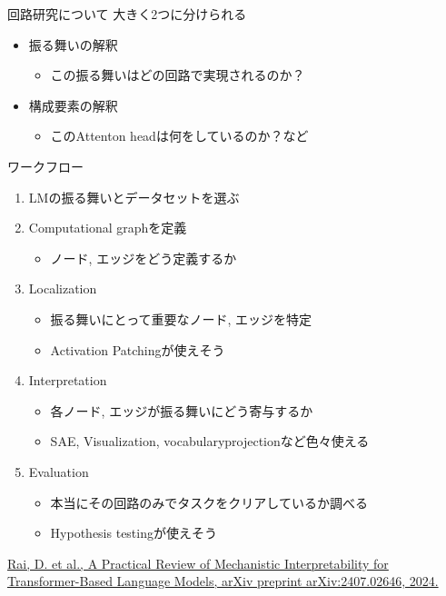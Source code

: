 \documentclass[aspectratio=43,xcolor=dvipsnames]{beamer}
\begin{document}
\begin{frame}{回路研究について}
    大きく2つに分けられる
    \begin{itemize}
        \item 振る舞いの解釈
        \begin{itemize}\scriptsize
            \item この振る舞いはどの回路で実現されるのか？
        \end{itemize}
        \item 構成要素の解釈
        \begin{itemize}\scriptsize
            \item このAttenton headは何をしているのか？など
        \end{itemize}
    \end{itemize}
    \vspace{0.5em}
    ワークフロー
    \begin{enumerate}
        \item LMの振る舞いとデータセットを選ぶ
        \item Computational graphを定義
        \begin{itemize}\scriptsize
            \item ノード, エッジをどう定義するか
        \end{itemize}
        \item Localization
        \begin{itemize}\scriptsize
            \item 振る舞いにとって重要なノード, エッジを特定
            \item Activation Patchingが使えそう
        \end{itemize}
        \item Interpretation
        \begin{itemize}\scriptsize
            \item 各ノード, エッジが振る舞いにどう寄与するか
            \item SAE, Visualization, vocabularyprojectionなど色々使える
        \end{itemize}
        \item Evaluation
        \begin{itemize}\scriptsize
            \item 本当にその回路のみでタスクをクリアしているか調べる
            \item Hypothesis testingが使えそう
        \end{itemize}
    \end{enumerate}
    \vspace{0.5em}
    \tiny
    \href{https://arxiv.org/abs/2407.02646}{Rai, D. et al., A Practical Review of Mechanistic Interpretability for Transformer-Based Language Models, arXiv preprint arXiv:2407.02646, 2024.}
\end{frame}
\end{document}
